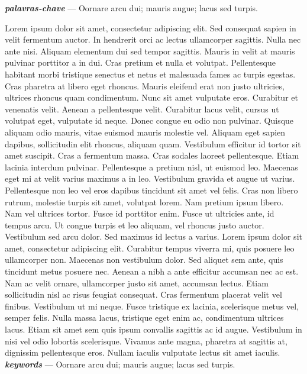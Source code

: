 \documentclass[./main.tex]{subfiles}
\begin{document}
\noindent \textit{\textbf{palavras-chave}} --- Oornare arcu dui; mauris augue; lacus sed turpis.
\clearpage

\large
\begin{center}
    \vspace{5mm}
\end{center}
\singlespacing
\normalsize
Lorem ipsum dolor sit amet, consectetur adipiscing elit. Sed consequat sapien in velit fermentum auctor. In hendrerit orci ac lectus ullamcorper sagittis. Nulla nec ante nisi. Aliquam elementum dui sed tempor sagittis. Mauris in velit at mauris pulvinar porttitor a in dui. Cras pretium et nulla et volutpat. Pellentesque habitant morbi tristique senectus et netus et malesuada fames ac turpis egestas. Cras pharetra at libero eget rhoncus. Mauris eleifend erat non justo ultricies, ultrices rhoncus quam condimentum. Nunc sit amet vulputate eros. Curabitur et venenatis velit. Aenean a pellentesque velit. Curabitur lacus velit, cursus ut volutpat eget, vulputate id neque. Donec congue eu odio non pulvinar. Quisque aliquam odio mauris, vitae euismod mauris molestie vel. Aliquam eget sapien dapibus, sollicitudin elit rhoncus, aliquam quam. Vestibulum efficitur id tortor sit amet suscipit. Cras a fermentum massa. Cras sodales laoreet pellentesque. Etiam lacinia interdum pulvinar. Pellentesque a pretium nisl, ut euismod leo. Maecenas eget mi at velit varius maximus a in leo. Vestibulum gravida et augue ut varius. Pellentesque non leo vel eros dapibus tincidunt sit amet vel felis. Cras non libero rutrum, molestie turpis sit amet, volutpat lorem. Nam pretium ipsum libero. Nam vel ultrices tortor. Fusce id porttitor enim. Fusce ut ultricies ante, id tempus arcu. Ut congue turpis et leo aliquam, vel rhoncus justo auctor. Vestibulum sed arcu dolor. Sed maximus id lectus a varius. Lorem ipsum dolor sit amet, consectetur adipiscing elit. Curabitur tempus viverra mi, quis posuere leo ullamcorper non. Maecenas non vestibulum dolor. Sed aliquet sem ante, quis tincidunt metus posuere nec. Aenean a nibh a ante efficitur accumsan nec ac est. Nam ac velit ornare, ullamcorper justo sit amet, accumsan lectus. Etiam sollicitudin nisl ac risus feugiat consequat. Cras fermentum placerat velit vel finibus. Vestibulum ut mi neque. Fusce tristique ex lacinia, scelerisque metus vel, semper felis. Nulla massa lacus, tristique eget enim ac, condimentum ultrices lacus. Etiam sit amet sem quis ipsum convallis sagittis ac id augue. Vestibulum in nisi vel odio lobortis scelerisque. Vivamus ante magna, pharetra at sagittis at, dignissim pellentesque eros. Nullam iaculis vulputate lectus sit amet iaculis.\\[2ex]
	
\noindent \textit{\textbf{keywords}} --- Oornare arcu dui; mauris augue; lacus sed turpis.

\clearpage
\end{document}
